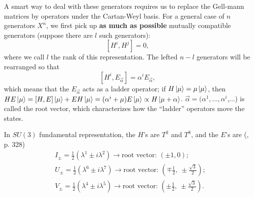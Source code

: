 \documentclass[12pt]{article}
\begin{document}
	A smart way to deal with these generators requires us to replace the Gell-mann matrices by operators under the Cartan-Weyl basis. For a general case of $n$ generators $X^n$, we first pick up \textbf{as much as possible} mutually compatible generators (suppose there are $l$ such generators):
	\begin{equation}
		\left[H^i, H^j\right] = 0,
	\end{equation}
	where we call $l$ the rank of this representation. The lefted $n - l$ generators will be rearranged so that
	\begin{equation}
		\left[H^i, E_{\vec\alpha} \right] = \alpha^i E_{\vec\alpha},
	\end{equation}
	which means that the $E_{\vec{\alpha}}$ acts as a ladder operator; if $H\ket{\mu} = \mu \ket{\mu}$, then $HE\ket{\mu} = [H, E]\ket{\mu} + EH\ket{\mu} = (\alpha^i + \mu) E\ket{\mu} \propto H\ket{\mu + \alpha}$. $\vec{\alpha} = (\alpha^1, ..., \alpha^i$,...) is called the root vector, which characterizes how the ``ladder'' operators move the states. 
	
	In $SU(3)$ fundamental representation, the $H$'s are $T^3$ and $T^8$, and the $E$'s are (\cite{azee2016group}, p. 328)
	\begin{align}
		&I_{\pm} = \frac{1}{2}\left( \lambda^1 \pm i\lambda^2 \right) \rightarrow \text{root vector: }(\pm 1, 0); \\
		&U_{\pm} = \frac{1}{2}\left( \lambda^6 \pm i\lambda^7 \right) \rightarrow \text{root vector: }\left(\mp \frac{1}{2},\ \pm \frac{\sqrt{3}}{2}\right); \\
		&V_{\pm} = \frac{1}{2}\left( \lambda^4 \pm i\lambda^5 \right) \rightarrow \text{root vector: }\left(\pm \frac{1}{2},\ \pm \frac{\sqrt{3}}{2}\right).
	\end{align}
	
	
	
	
	
	
\end{document}
